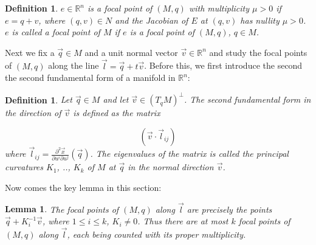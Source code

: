 \documentclass[12pt]{article}
\newtheorem{lem}[thm]{Lemma}
\newtheorem{defn}[thm]{Definition}
\newcommand{\RR}{\mathbb{R}}      %
\newcommand{\vect}[1]{\vec{#1}}
\begin{document}
\begin{defn}
  $e \in \RR^n$ is a focal point of $(M, q)$ with multiplicity $\mu > 0$ if $e =
  q+v$, where $(q, v) \in N$ and the Jacobian of $E$ at $(q, v)$ has nullity
  $\mu > 0$. $e$ is called a focal point of $M$ if $e$ is a focal point of $(M,
  q)$, $q \in M$.
\end{defn}

Next we fix a $\vect{q} \in M$ and a unit normal vector $\vect{v} \in \RR^n$ and
study the focal points of $(M, q)$ along the line $\vect{l} =
\vect{q}+t\vect{v}$. Before this, we first introduce the second the second
fundamental form of a manifold in $\RR^n$:

\begin{defn}
  Let $\vect{q} \in M$ and let $\vect{v} \in (T_qM)^\perp$. The second
  fundamental form in the direction of $\vect{v}$ is defined as the matrix

  \begin{equation}
    \left(
      \vect{v} \cdot \vect{l}_{ij}
    \right)
  \end{equation}
  where $\vect{l}_{ij} = \frac{\partial^2 \vect{x}}{\partial u^i \partial
    u^j}(\vect{q})$.
  The eigenvalues of the matrix is called the principal curvatures $K_1$, ..,
  $K_k$ of $M$ at $\vect{q}$ in the normal direction $\vect{v}$.
\end{defn}

Now comes the key lemma in this section:

\begin{lem}
  The focal points of $(M, q)$ along $\vect{l}$  are precisely the points
  $\vect{q}+K_i^{-1}\vect{v}$, where $1 \le i \le k$, $K_i \ne 0$. Thus there
  are at most $k$ focal points of $(M,q)$ along $\vect{l}$, each being counted
  with its proper multiplicity.
\end{lem}
\end{document}
